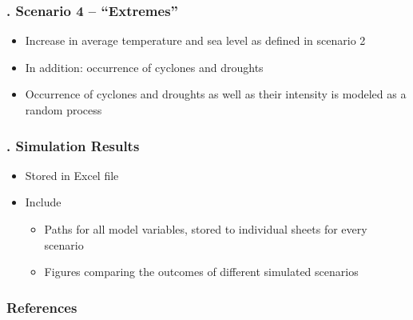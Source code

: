 \documentclass[11pt,aspectratio=169]{beamer}
\begin{document}
\begin{frame}
\frametitle{{\thesection.\thesubsection} Scenario 4 -- "`Extremes"'}
\begin{itemize}
	\item Increase in average temperature and sea level as defined in scenario 2
	\item In addition: occurrence of cyclones and droughts 
	\item Occurrence of cyclones and droughts as well as their intensity is modeled as a random process		
\end{itemize}
\end{frame}

\begin{frame}
\frametitle{{\thesection.\thesubsection} Simulation Results}
\begin{itemize}
\item Stored in Excel file 
\item Include 
	\begin{itemize}
		\item Paths for all model variables, stored to individual sheets for every scenario
		\item Figures comparing the outcomes of different simulated scenarios
		\end{itemize}
\end{itemize}
\end{frame}

\begin{frame}[allowframebreaks]%
\frametitle{References}
\scriptsize{
\printbibliography}
\end{frame}
\end{document}

